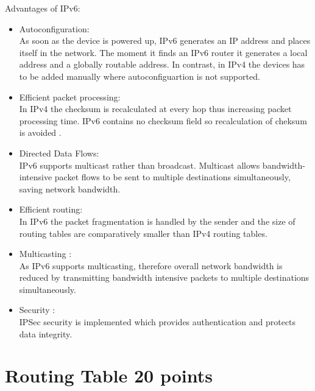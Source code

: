 \documentclass{resources/WeSTassignment}
\begin{document}
Advantages of IPv6:
\begin{itemize}
\item Autoconfiguration:\\ As soon as the device is powered up, IPv6 generates an IP address and places itself in the network. The moment it finds an IPv6 router it generates a local address and a globally routable address. In contrast, in IPv4 the devices has to be added manually where autoconfiguartion is not supported.
\item Efficient packet processing:\\ In IPv4 the checksum is recalculated at every hop thus increasing packet processing time. IPv6 contains no checksum field so recalculation of cheksum is avoided .
\item Directed Data Flows:\\ IPv6 supports multicast rather than broadcast. Multicast allows bandwidth-intensive packet flows to be sent to multiple destinations simultaneously, saving network bandwidth.
\item Efficient routing: \\ In IPv6 the packet fragmentation is handled by the sender and the size of routing tables are comparatively smaller than IPv4 routing tables.
\item Multicasting :\\ As IPv6 supports multicasting, therefore overall network bandwidth is reduced by  transmitting bandwidth intensive packets to  multiple destinations simultaneously.
\item Security : \\ IPSec security is implemented which provides authentication and protects data integrity.

\end{itemize}
\section{Routing Table \hfill {20 points}}
\end{document}
